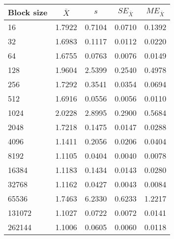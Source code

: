 \begin{tabular}{lcccc}\toprule
{\small Block size} & $\bar{X}$ & $s$ & $SE_{\bar{X}}$ & $ME_{\bar{X}}$ \\\midrule
16 & 1.7922 & 0.7104 & 0.0710 & 0.1392\\
32 & 1.6983 & 0.1117 & 0.0112 & 0.0220\\
64 & 1.6755 & 0.0763 & 0.0076 & 0.0149\\
128 & 1.9604 & 2.5399 & 0.2540 & 0.4978\\
256 & 1.7292 & 0.3541 & 0.0354 & 0.0694\\
512 & 1.6916 & 0.0556 & 0.0056 & 0.0110\\
1024 & 2.0228 & 2.8995 & 0.2900 & 0.5684\\
2048 & 1.7218 & 0.1475 & 0.0147 & 0.0288\\
4096 & 1.1411 & 0.2056 & 0.0206 & 0.0404\\
8192 & 1.1105 & 0.0404 & 0.0040 & 0.0078\\
16384 & 1.1183 & 0.1434 & 0.0143 & 0.0280\\
32768 & 1.1162 & 0.0427 & 0.0043 & 0.0084\\
65536 & 1.7463 & 6.2330 & 0.6233 & 1.2217\\
131072 & 1.1027 & 0.0722 & 0.0072 & 0.0141\\
262144 & 1.1006 & 0.0605 & 0.0060 & 0.0118\\
\bottomrule
\end{tabular}
